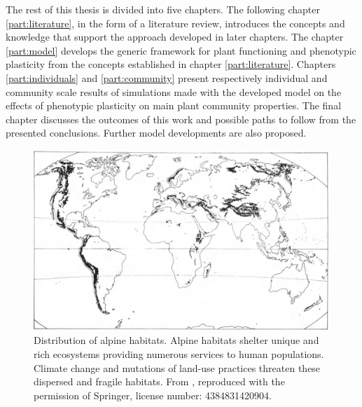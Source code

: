 The rest of this thesis is divided into five chapters. The following chapter \ref{part:literature}, in the form of a literature review, introduces the concepts and knowledge that support the approach developed in later chapters. The chapter \ref{part:model} develops the generic framework for plant functioning and phenotypic plasticity from the concepts established in chapter \ref{part:literature}. Chapters \ref{part:individuals} and \ref{part:community} present respectively individual and community scale results of simulations made with the developed model \model on the effects of phenotypic plasticity on main plant community properties. The final chapter discusses the outcomes of this work and possible paths to follow from the presented conclusions. Further model developments are also proposed.


\begin{figure}
\includegraphics{./1_Introduction/graphics/alpine_distribution.jpeg}
\caption{Distribution of alpine habitats. Alpine habitats shelter unique and rich ecosystems providing numerous services to human populations. Climate change and mutations of land-use practices threaten these dispersed and fragile habitats. From \citet{korner_alpine_2003}, reproduced with the permission of Springer, license number: 4384831420904.} \label{fig:distribution}
\end{figure}
